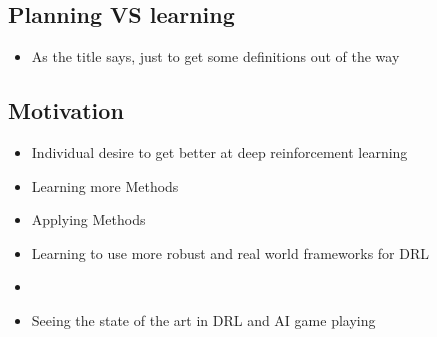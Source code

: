 \documentclass[a4paper]{article}
\begin{document}
\subsection{Planning VS learning}
\begin{itemize}
    \item As the title says, just to get some definitions out of the way
\end{itemize}

\subsection{Motivation}
\begin{itemize}
    \item Individual desire to get better at deep reinforcement learning
    \item Learning more Methods
    \item Applying Methods
    \item Learning to use more robust and real world frameworks for DRL
    \item
    \item Seeing the state of the art in DRL and AI game playing
\end{itemize}
\end{document}
